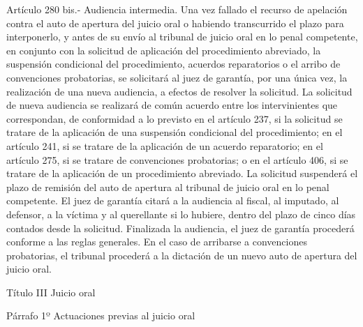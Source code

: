     Artículo 280 bis.- Audiencia intermedia. Una vez fallado el recurso de apelación contra el auto de apertura del juicio oral o habiendo transcurrido el plazo para interponerlo, y antes de su envío al tribunal de juicio oral en lo penal competente, en conjunto con la solicitud de aplicación del procedimiento abreviado, la suspensión condicional del procedimiento, acuerdos reparatorios o el arribo de convenciones probatorias, se solicitará al juez de garantía, por una única vez, la realización de una nueva audiencia, a efectos de resolver la solicitud.
    La solicitud de nueva audiencia se realizará de común acuerdo entre los intervinientes que correspondan, de conformidad a lo previsto en el artículo 237, si la solicitud se tratare de la aplicación de una suspensión condicional del procedimiento; en el artículo 241, si se tratare de la aplicación de un acuerdo reparatorio; en el artículo 275, si se tratare de convenciones probatorias; o en el artículo 406, si se tratare de la aplicación de un procedimiento abreviado.
    La solicitud suspenderá el plazo de remisión del auto de apertura al tribunal de juicio oral en lo penal competente.
    El juez de garantía citará a la audiencia al fiscal, al imputado, al defensor, a la víctima y al querellante si lo hubiere, dentro del plazo de cinco días contados desde la solicitud.
    Finalizada la audiencia, el juez de garantía procederá conforme a las reglas generales. En el caso de arribarse a convenciones probatorias, el tribunal procederá a la dictación de un nuevo auto de apertura del juicio oral.

    Título III
    Juicio oral

    Párrafo 1º Actuaciones previas al juicio oral




